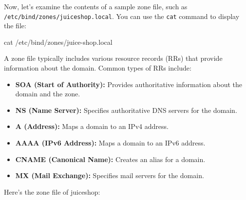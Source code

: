 \documentclass[a4paper,11pt,singlespacing]{article}
\newenvironment{Shaded}{}{}
\newcommand{\ErrorTok}[1]{\textcolor[rgb]{1.00,0.00,0.00}{\textbf{#1}}}
\newcommand{\ExtensionTok}[1]{#1}
\newcommand{\FunctionTok}[1]{\textcolor[rgb]{0.02,0.16,0.49}{#1}}
\newcommand{\KeywordTok}[1]{\textcolor[rgb]{0.00,0.44,0.13}{\textbf{#1}}}
\newcommand{\NormalTok}[1]{#1}
\newcommand{\VariableTok}[1]{\textcolor[rgb]{0.10,0.09,0.49}{#1}}
\providecommand{\tightlist}{%
  \setlength{\itemsep}{0pt}\setlength{\parskip}{0pt}}
\begin{document}
Now, let's examine the contents of a sample zone file, such as
\texttt{/etc/bind/zones/juiceshop.local}. You can use the \texttt{cat}
command to display the file:

\begin{Shaded}
\begin{Highlighting}[]
\FunctionTok{cat}\NormalTok{ /etc/bind/zones/juice{-}shop.local}
\end{Highlighting}
\end{Shaded}

A zone file typically includes various resource records (RRs) that
provide information about the domain. Common types of RRs include:

\begin{itemize}
\tightlist
\item
  \textbf{SOA (Start of Authority):} Provides authoritative information
  about the domain and the zone.
\item
  \textbf{NS (Name Server):} Specifies authoritative DNS servers for the
  domain.
\item
  \textbf{A (Address):} Maps a domain to an IPv4 address.
\item
  \textbf{AAAA (IPv6 Address):} Maps a domain to an IPv6 address.
\item
  \textbf{CNAME (Canonical Name):} Creates an alias for a domain.
\item
  \textbf{MX (Mail Exchange):} Specifies mail servers for the domain.
\end{itemize}

\newpage

Here's the zone file of juiceshop:

\begin{Shaded}
\end{Shaded}
\end{document}
